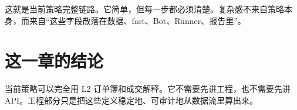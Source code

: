 这就是当前策略完整链路。它简单，但每一步都必须清楚。复杂感不来自策略本身，而来自“这些字段散落在数据、fast、Bot、Runner、报告里”。

\section{这一章的结论}

当前策略可以完全用 L2 订单簿和成交解释。它不需要先讲工程，也不需要先讲 API。工程部分只是把这些定义稳定地、可审计地从数据流里算出来。

